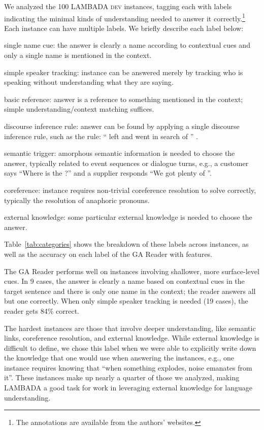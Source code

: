 \documentclass[11pt]{article}
\newcommand{\dev}{\textsc{dev}\xspace}
\newenvironment{itemizesquish}{\begin{list}{\labelitemi}{\setlength{\itemsep}{0em}\setlength{\labelwidth}{0.5em}\setlength{\leftmargin}{\labelwidth}\addtolength{\leftmargin}{\labelsep}}}{\end{list}}
\begin{document}
We analyzed the 100 LAMBADA \dev instances, tagging each with labels indicating the minimal kinds of understanding needed to answer it correctly.\footnote{The annotations are available from the authors' websites.} 
Each instance can have multiple labels. We briefly describe each label below:
\begin{itemizesquish}
\item single name cue: the answer is clearly a name according to contextual cues and only a single name is mentioned in the context.
\item simple speaker tracking: instance can be answered merely by tracking who is speaking without understanding what they are saying. 
\item basic reference: answer is a reference to something mentioned in the context; simple understanding/context matching suffices.
\item discourse inference rule: answer can be found by applying a single discourse inference rule, such as the rule: 
`` left  and went in search of '' . 
\item semantic trigger: amorphous semantic information is needed to choose the answer, typically related to event sequences or dialogue turns, e.g., a customer says ``Where is the ?'' and a supplier responds ``We got plenty of ''.
\item coreference: instance requires non-trivial coreference resolution to solve correctly, typically the resolution of anaphoric pronouns. 
\item external knowledge: some particular external knowledge is needed to choose the answer.
\end{itemizesquish}
Table~\ref{tab:categories} shows the breakdown of these labels across instances, as well as the accuracy on each label of the GA Reader with features. 

The GA Reader performs well on instances involving shallower, more surface-level cues. 
In 9 cases, the answer is clearly a name based on contextual cues in the target sentence and there is only one name in the context; the reader answers all but one correctly. 
When only simple speaker tracking is needed (19 cases), the reader gets 84\% correct. 

The hardest instances are those that involve deeper understanding, like semantic links, coreference resolution, and external knowledge. While external knowledge is difficult to define, we chose this label when we were able to explicitly write down the knowledge that one would use when answering the instances, e.g., one instance requires knowing that ``when something explodes, noise emanates from it''. These instances make up nearly a quarter of those we analyzed, making LAMBADA a good task for work in leveraging external knowledge for language understanding. 
\end{document}
